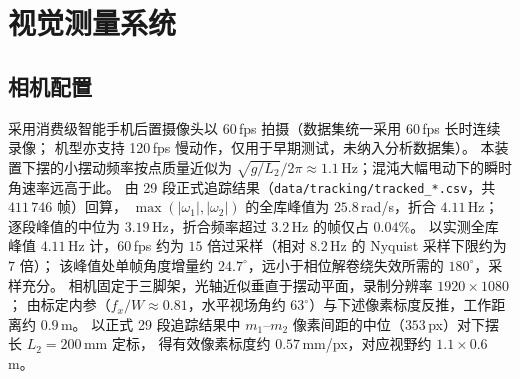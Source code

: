 \documentclass[a4paper,12pt]{ctexart}   %
\begin{document}
\section{视觉测量系统}
\label{sec:vision}

\subsection{相机配置}
采用消费级智能手机后置摄像头以 $60$\,fps 拍摄（数据集统一采用 60\,fps 长时连续录像；
机型亦支持 120\,fps 慢动作，仅用于早期测试，未纳入分析数据集）。
本装置下摆的小摆动频率按点质量近似为 $\sqrt{g / L_2}/2\pi \approx 1.1$\,Hz；混沌大幅甩动下的瞬时角速率远高于此。
由 29 段正式追踪结果（\texttt{data/tracking/tracked\_*.csv}，共 $411\,746$ 帧）回算，
$\max(|\omega_1|, |\omega_2|)$ 的全库峰值为 $25.8$\,rad/s，折合 $4.11$\,Hz；
逐段峰值的中位为 $3.19$\,Hz，折合频率超过 $3.2$\,Hz 的帧仅占 $0.04\%$。
以实测全库峰值 $4.11$\,Hz 计，$60$\,fps 约为 $15$ 倍过采样（相对 $8.2$\,Hz 的 Nyquist 采样下限约为 $7$ 倍）；
该峰值处单帧角度增量约 $24.7^\circ$，远小于相位解卷绕失效所需的 $180^\circ$，采样充分。
相机固定于三脚架，光轴近似垂直于摆动平面，录制分辨率 $1920 \times 1080$；
由标定内参（$f_x / W \approx 0.81$，水平视场角约 $63^\circ$）与下述像素标度反推，工作距离约 $0.9$\,m。
以正式 29 段追踪结果中 $m_1$--$m_2$ 像素间距的中位（$353$\,px）对下摆长 $L_2 = 200$\,mm 定标，
得有效像素标度约 $0.57$\,mm/px，对应视野约 $1.1 \times 0.6$\,m。
\end{document}
